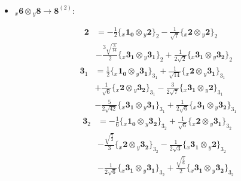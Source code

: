 \documentclass[english]{article}
\newcommand{\rep}[1]{\mathbf{#1}}
\newcommand{\repx}[2]{{}_{#2}\mathbf{#1}}
\newcommand{\tsprodx}[2]{\repx{#1}{x}\otimes\repx{#2}{y}}
\newcommand{\subcgs}[3]{\big\{ \tsprodx{#1}{#2}\big\}^{}_{#3}}
\begin{document}
\begin{itemize}
\begin{fleqn}
\begin{align*}
\end{align*}
\end{fleqn}
\item $\tsprodx{6}{8}\to\rep{8}^{(2)}$:
\begin{fleqn}
\begin{align*}
\rep{2} & = -\frac{1}{2}\subcgs{1_{0}}{2}{2}-\frac{1}{\sqrt{7}}\subcgs{2}{2}{2} \\ 
 & -\frac{3 \sqrt{\frac{3}{14}}}{2}\subcgs{3_{1}}{3_{1}}{2}+\frac{1}{2 \sqrt{2}}\subcgs{3_{1}}{3_{2}}{2}
\end{align*}
\begin{align*}
\rep{3}_{1} & = \frac{1}{2}\subcgs{1_{0}}{3_{1}}{3_{1}}+\frac{1}{\sqrt{14}}\subcgs{2}{3_{1}}{3_{1}} \\ 
 & +\frac{1}{\sqrt{6}}\subcgs{2}{3_{2}}{3_{1}}-\frac{3}{2 \sqrt{7}}\subcgs{3_{1}}{2}{3_{1}} \\ 
 & -\frac{5}{2 \sqrt{42}}\subcgs{3_{1}}{3_{1}}{3_{1}}+\frac{1}{2 \sqrt{6}}\subcgs{3_{1}}{3_{2}}{3_{1}}
\end{align*}
\begin{align*}
\rep{3}_{2} & = -\frac{1}{6}\subcgs{1_{0}}{3_{2}}{3_{2}}+\frac{1}{\sqrt{6}}\subcgs{2}{3_{1}}{3_{2}} \\ 
 & -\frac{\sqrt{\frac{7}{2}}}{3}\subcgs{2}{3_{2}}{3_{2}}-\frac{1}{2 \sqrt{3}}\subcgs{3_{1}}{2}{3_{2}} \\ 
 & -\frac{1}{2 \sqrt{6}}\subcgs{3_{1}}{3_{1}}{3_{2}}+\frac{\sqrt{\frac{7}{6}}}{2}\subcgs{3_{1}}{3_{2}}{3_{2}}
\end{align*}
\end{fleqn}
\end{itemize}
\end{document}

